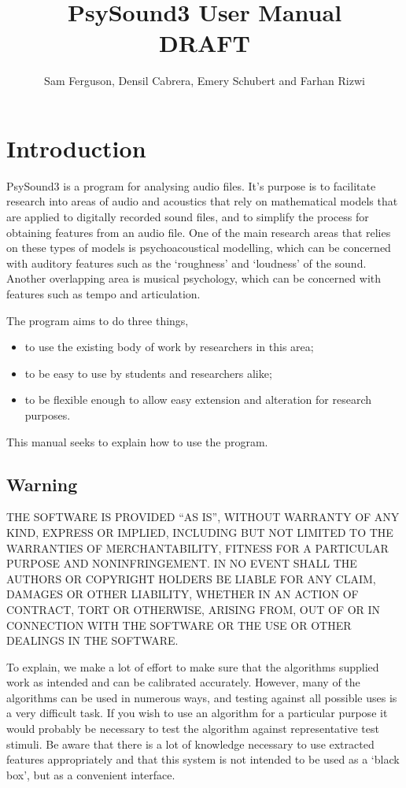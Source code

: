 \documentclass{article}
\title{PsySound3 User Manual \\ DRAFT}
\author{Sam Ferguson, Densil Cabrera, Emery Schubert and Farhan Rizwi}
\begin{document}
	\maketitle
	\tableofcontents
\section{Introduction}

PsySound3 is a program for analysing audio files. It's purpose is to facilitate research into areas of audio and acoustics that rely on mathematical models that are applied to digitally recorded sound files, and to simplify the process for obtaining features from an audio file. One of the main research areas that relies on these types of models is psychoacoustical modelling, which can be concerned with auditory features such as the  `roughness' and `loudness' of the sound. Another overlapping area is musical psychology, which can be concerned with features such as tempo and articulation. 

The program aims to do three things, 
\begin{itemize} 
	\item to use the existing body of work by researchers in this area;
	\item to be easy to use by students and researchers alike;
	\item to be flexible enough to allow easy extension and alteration for research purposes.
\end{itemize}

This manual seeks to explain how to use the program. 

\subsection{Warning}

\begin{center}
THE SOFTWARE IS PROVIDED ``AS IS'', WITHOUT WARRANTY OF ANY KIND, EXPRESS OR IMPLIED, INCLUDING BUT NOT LIMITED TO THE WARRANTIES OF MERCHANTABILITY, FITNESS FOR A PARTICULAR PURPOSE AND NONINFRINGEMENT. IN NO EVENT SHALL THE AUTHORS OR COPYRIGHT HOLDERS BE LIABLE FOR ANY CLAIM, DAMAGES OR OTHER LIABILITY, WHETHER IN AN ACTION OF CONTRACT, TORT OR OTHERWISE, ARISING FROM, OUT OF OR IN CONNECTION WITH THE SOFTWARE OR THE USE OR OTHER DEALINGS IN THE SOFTWARE.
\end{center}

To explain, we make a lot of effort to make sure that the algorithms supplied work as intended and can be calibrated accurately. However, many of the algorithms can be used in numerous ways, and testing against all possible uses is a very difficult task. If you wish to use an algorithm for a particular purpose it would probably be necessary to test the algorithm against representative test stimuli. Be aware that there is a lot of knowledge necessary to use extracted features appropriately and that this system is not intended to be used as a `black box', but as a convenient interface. 
\end{document}
